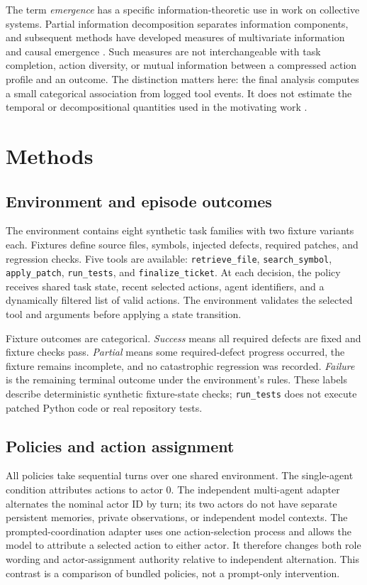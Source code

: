 \documentclass[pdflatex,sn-basic,Numbered]{sn-jnl}
\begin{document}
The term \emph{emergence} has a specific information-theoretic use in work on collective systems. Partial information decomposition separates information components, and subsequent methods have developed measures of multivariate information and causal emergence \cite{WilliamsBeer,Kolchinsky,Rosas}. Such measures are not interchangeable with task completion, action diversity, or mutual information between a compressed action profile and an outcome. The distinction matters here: the final analysis computes a small categorical association from logged tool events. It does not estimate the temporal or decompositional quantities used in the motivating work \cite{Riedl}.

\section{Methods}

\subsection{Environment and episode outcomes}

The environment contains eight synthetic task families with two fixture variants each. Fixtures define source files, symbols, injected defects, required patches, and regression checks. Five tools are available: \texttt{retrieve\_file}, \texttt{search\_symbol}, \texttt{apply\_patch}, \texttt{run\_tests}, and \texttt{finalize\_ticket}. At each decision, the policy receives shared task state, recent selected actions, agent identifiers, and a dynamically filtered list of valid actions. The environment validates the selected tool and arguments before applying a state transition.

Fixture outcomes are categorical. \emph{Success} means all required defects are fixed and fixture checks pass. \emph{Partial} means some required-defect progress occurred, the fixture remains incomplete, and no catastrophic regression was recorded. \emph{Failure} is the remaining terminal outcome under the environment's rules. These labels describe deterministic synthetic fixture-state checks; \texttt{run\_tests} does not execute patched Python code or real repository tests.

\subsection{Policies and action assignment}

All policies take sequential turns over one shared environment. The single-agent condition attributes actions to actor 0. The independent multi-agent adapter alternates the nominal actor ID by turn; its two actors do not have separate persistent memories, private observations, or independent model contexts. The prompted-coordination adapter uses one action-selection process and allows the model to attribute a selected action to either actor. It therefore changes both role wording and actor-assignment authority relative to independent alternation. This contrast is a comparison of bundled policies, not a prompt-only intervention.
\end{document}
